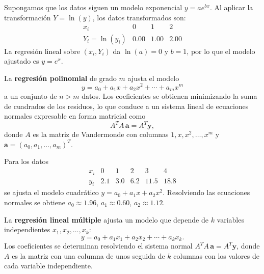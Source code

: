 \documentclass[a4,11pt]{aleph-notas}
\begin{document}
\begin{ejem}
    Supongamos que los datos siguen un modelo exponencial $y=ae^{bx}$. Al aplicar la transformación $Y=\ln(y)$, los datos transformados son:
    \[
        \begin{array}{c|ccc}
            x_i & 0 & 1 & 2\\
            \hline
            Y_i=\ln(y_i) & 0.00 & 1.00 & 2.00
        \end{array}
    \]
    La regresión lineal sobre $(x_i,Y_i)$ da $\ln(a)=0$ y $b=1$, por lo que el modelo ajustado es $y=e^x$.
\end{ejem}

\begin{defi}
    La \textbf{regresión polinomial} de grado $m$ ajusta el modelo
    \[
        y = a_0 + a_1 x + a_2 x^2 + \cdots + a_m x^m
    \]
    a un conjunto de $n>m$ datos. Los coeficientes se obtienen minimizando la suma de cuadrados de los residuos, lo que conduce a un sistema lineal de ecuaciones normales expresable en forma matricial como
    \[
        A^T A\,\mathbf{a} = A^T\mathbf{y},
    \]
    donde $A$ es la matriz de Vandermonde con columnas $1,x,x^2,\ldots,x^m$ y $\mathbf{a}=(a_0,a_1,\ldots,a_m)^T$.
\end{defi}

\begin{ejem}
    Para los datos
    \[
        \begin{array}{c|ccccc}
            x_i & 0 & 1 & 2 & 3 & 4\\
            \hline
            y_i & 2.1 & 3.0 & 6.2 & 11.5 & 18.8
        \end{array}
    \]
    se ajusta el modelo cuadrático $y=a_0+a_1 x+a_2 x^2$. Resolviendo las ecuaciones normales se obtiene $a_0\approx 1.96$, $a_1\approx 0.60$, $a_2\approx 1.12$.
\end{ejem}

\begin{defi}
    La \textbf{regresión lineal múltiple} ajusta un modelo que depende de $k$ variables independientes $x_1,x_2,\ldots,x_k$:
    \[
        y = a_0 + a_1 x_1 + a_2 x_2 + \cdots + a_k x_k.
    \]
    Los coeficientes se determinan resolviendo el sistema normal $A^T A\,\mathbf{a} = A^T\mathbf{y}$, donde $A$ es la matriz con una columna de unos seguida de $k$ columnas con los valores de cada variable independiente.
\end{defi}
\end{document}
